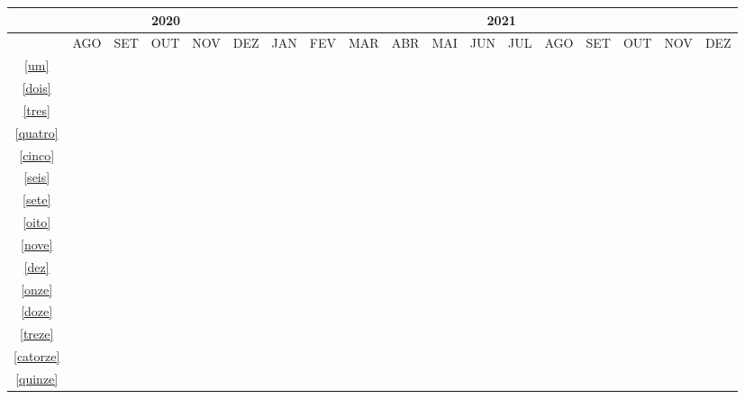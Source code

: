 \begin{landscape}
\begin{table}[!htbp]
    \centering
		\begin{tabular}{|c|c|c|c|c|c|c|c|c|c|c|c|c|c|c|c|c|c|}
		\hline
		&\multicolumn{5}{c|}{2020}&\multicolumn{12}{c|}{2021}\\
		\hline
		&AGO&SET&OUT&NOV&DEZ&JAN&FEV&MAR&ABR&MAI&JUN&JUL&AGO&SET&OUT&NOV&DEZ\\
		\hline
		\ref{um}&\cellcolor{midgray}&\cellcolor{midgray}&&&&&&&&&&&&&&&\\
		\hline
		\ref{dois}&&\cellcolor{midgray}&&&&&&&&&&&&&&&\\
		\hline	
		\ref{tres}&&\cellcolor{midgray}&&&&&&&&&&&&&&&\\
		\hline			
		\ref{quatro}&&\cellcolor{midgray}&\cellcolor{midgray}&&&&&&&&&&&&&&\\
		\hline	
		\ref{cinco}&&&\cellcolor{midgray}&\cellcolor{midgray}&&&&&&&&&&&&&\\
		\hline
		\ref{seis}&&&&\cellcolor{midgray}&\cellcolor{midgray}&&&&&&&&&&&&\\
		\hline	
		\ref{sete}&&&&&\cellcolor{midgray}&\cellcolor{midgray}&&&&&&&&&&&\\
		\hline	
		\ref{oito}&&&&&\cellcolor{midgray}&\cellcolor{midgray}&\cellcolor{midgray}&&&&&&&&&&\\
		\hline	
		\ref{nove}&&&&&&&\cellcolor{midgray}&\cellcolor{midgray}&&&&&&&&&\\
		\hline	
		\ref{dez}&&&&&&&&&\cellcolor{midgray}&&&&&&&&\\
		\hline	
		\ref{onze}&&&&&&&&&\cellcolor{midgray}&\cellcolor{midgray}&&&&&&&\\
		\hline	
		\ref{doze}&&&&&&&&&&\cellcolor{midgray}&\cellcolor{midgray}&\cellcolor{midgray}&&&&&\\
		\hline	
		\ref{treze}&&&&&&&&&&&&\cellcolor{midgray}&&&&&\\
		\hline
		
		\ref{catorze}&&&&&&&&&&&&\cellcolor{midgray}&\cellcolor{midgray}&\cellcolor{midgray}&\cellcolor{midgray}&\cellcolor{midgray}&\\
		\hline	
		\ref{quinze}&&&&&&&&&&&&\cellcolor{midgray}&\cellcolor{midgray}&\cellcolor{midgray}&\cellcolor{midgray}&\cellcolor{midgray}&\\
		\hline	
		\end{tabular}
\end{table}
\end{landscape}